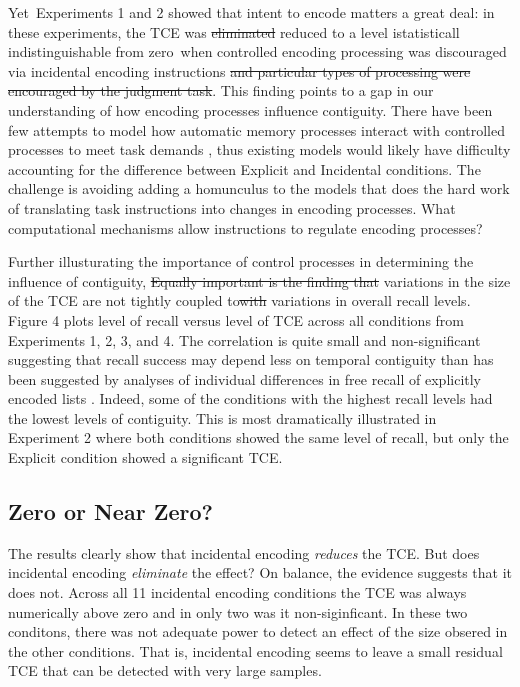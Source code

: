 \documentclass[man,natbib,floatsintext]{apa6} %
\begin{document}
\color{red}Yet\color{black}~Experiments 1 and 2 showed that intent to encode matters a great deal: in these experiments, the TCE was \st{eliminated} \color{red}reduced to a level istatisticall indistinguishable from zero\color{black}~when controlled encoding processing was discouraged via incidental encoding instructions \st{and particular types of processing were encouraged by the judgment task}. This finding points to a gap in our understanding of how encoding processes influence contiguity. There have been few attempts to model how automatic memory processes interact with controlled processes to meet task demands \citep{LehmMalm13,PolyEtal09}, thus existing models would likely have difficulty accounting for the difference between Explicit and Incidental conditions. The challenge is avoiding adding a homunculus to the models that does the hard work of translating task instructions into changes in encoding processes. What computational mechanisms allow instructions to regulate encoding processes?

\color{red}Further illusturating the importance of control processes in determining the influence of contiguity,\color{black}
\st{Equally important is the finding that} variations in the size of the TCE are not tightly coupled \color{red}to\color{black}\st{with} variations in overall recall levels. Figure 4 plots level of recall versus level of TCE across all conditions from Experiments 1, 2, 3, \color{red} and 4\color{black}. \label{done-12} \color{red} The correlation is quite small and non-significant \color{black} suggesting that recall success may depend less on temporal contiguity than has been suggested by analyses of individual differences in free recall of explicitly encoded lists \citep{SedeEtal10,HealEtal14}. Indeed, some of the conditions with the highest recall levels had the lowest levels of contiguity. This is most dramatically illustrated in Experiment 2 where both conditions showed the same level of recall, but only the Explicit condition showed a significant TCE.



\label{zerovsnear}
\color{red}
\subsection{Zero or Near Zero?}
The results clearly show that incidental encoding \emph{reduces} the TCE. But does incidental encoding \emph{eliminate} the effect? On balance, the evidence suggests that it does not. Across all 11 incidental encoding conditions the TCE was always numerically above zero and in only two was it non-siginficant. In these two conditons, there was not adequate power to detect an effect of the size obsered in the other conditions. That is, incidental encoding seems to leave a small residual TCE that can be detected with very large samples.
\end{document}
